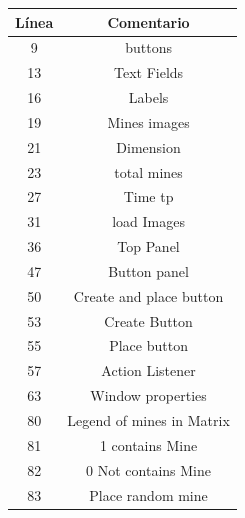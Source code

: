 \begin{table}[ht!]
\parbox{.40\linewidth}{
 
		\centering
   		\begin{tabular}{| c | c |}  
       \hline
\textbf{Línea} & \textbf{Comentario} \\ \hline
9&buttons  \\ \hline
13&Text Fields  \\ \hline
16&Labels  \\ \hline
19&Mines images  \\ \hline
21&Dimension  \\ \hline
23&total mines  \\ \hline
27&Time tp  \\ \hline
31&load Images  \\ \hline
36&Top Panel  \\ \hline
47&Button panel  \\ \hline
50&Create and place button  \\ \hline
53&Create Button  \\ \hline
55&Place button  \\ \hline
57&Action Listener  \\ \hline
63&Window properties  \\ \hline
80&Legend of mines in Matrix  \\ \hline
81&1 contains Mine  \\ \hline
82&0 Not contains Mine  \\ \hline
83&Place random mine  \\ \hline
\end{tabular}
}
\hfill
\parbox{.48\linewidth}{
 
}
\end{table}
